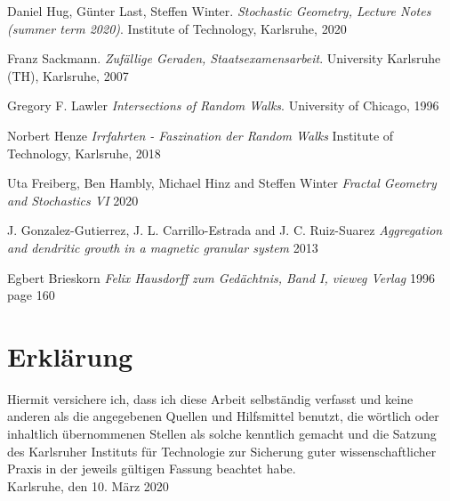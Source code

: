 \documentclass[12pt,a4paper]{scrartcl}
\numberwithin{equation}{subsection}
\newcommand{\1}{\mathbbm{1}}
\numberwithin{equation}{section}
\theoremstyle{definition}
\begin{document}
\begin{thebibliography}{biblio}
\thispagestyle{empty}

Daniel Hug, Günter Last, Steffen Winter.
\emph{Stochastic Geometry, 	Lecture Notes (summer term 2020)}.
Institute of Technology, Karlsruhe, 2020

Franz Sackmann. 
\emph{Zufällige Geraden, Staatsexamensarbeit}.
University Karlsruhe (TH), Karlsruhe, 2007

Gregory F. Lawler
\emph{Intersections of Random Walks}.
University of Chicago, 1996

Norbert Henze
\emph{Irrfahrten - Faszination der Random Walks}
Institute of Technology, Karlsruhe, 2018

Uta Freiberg, Ben Hambly, Michael Hinz and Steffen Winter
\emph{Fractal Geometry and Stochastics VI}
2020

J. Gonzalez-Gutierrez, J. L. Carrillo-Estrada and J. C. Ruiz-Suarez
\emph{Aggregation and dendritic growth in a magnetic granular system}
2013

Egbert Brieskorn
\emph{Felix Hausdorff zum Gedächtnis, Band I, vieweg Verlag}
1996
page 160



\end{thebibliography}

\newpage
  
\thispagestyle{empty}

\vspace*{8cm}


\section*{Erklärung}

Hiermit versichere ich, dass ich diese Arbeit selbständig verfasst und keine anderen als die angegebenen Quellen und Hilfsmittel benutzt, die wörtlich oder inhaltlich übernommenen Stellen als solche kenntlich gemacht und die Satzung des Karlsruher Instituts für Technologie zur Sicherung guter wissenschaftlicher Praxis in der jeweils gültigen Fassung beachtet habe. \\[2ex] 

\noindent
Karlsruhe, den 10. März 2020\\[5ex] 
\end{document}
